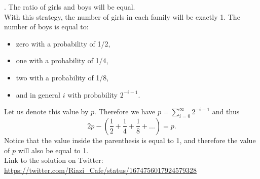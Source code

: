 \begin{solution}.
The ratio of girls and boys will be equal.\\[0.2cm]

With this strategy, the number of girls in each family will be exactly 1. The number of boys is equal to:

\begin{itemize}
\item zero with a probability of 1/2,
\item one with a probability of 1/4,
\item two with a probability of 1/8,
\item and in general $i$ with probability $2^{-i-1}$.
\end{itemize}

Let us denote this value by $p$. Therefore we have $p = \sum_{i=0}^{\infty} 2^{-i-1}$ and thus  $$2p - (\frac{1}{2} + \frac{1}{4} + \frac{1}{8} + ...) = p.$$
Notice that the value inside the parenthesis is equal to 1, and therefore the value of $p$ will also be equal to 1.\\[0.2cm]


Link to the solution on Twitter:  \url{https://twitter.com/Riazi_Cafe/status/1674756017924579328}\end{solution}